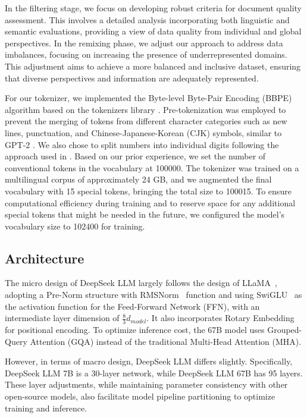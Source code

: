 In the filtering stage, we focus on developing robust criteria for document quality assessment. This involves a detailed analysis incorporating both linguistic and semantic evaluations, providing a view of data quality from individual and global perspectives. In the remixing phase, we adjust our approach to address data imbalances, focusing on increasing the presence of underrepresented domains. This adjustment aims to achieve a more balanced and inclusive dataset, ensuring that diverse perspectives and information are adequately represented.

For our tokenizer, we implemented the Byte-level Byte-Pair Encoding (BBPE) algorithm based on the tokenizers library \citep{hftokenizers}. Pre-tokenization was employed to prevent the merging of tokens from different character categories such as new lines, punctuation, and Chinese-Japanese-Korean (CJK) symbols, similar to GPT-2 \citep{gpt2}. We also chose to split numbers into individual digits following the approach used in \citep{llama, llama2}. Based on our prior experience, we set the number of conventional tokens in the vocabulary at 100000. The tokenizer was trained on a multilingual corpus of approximately 24 GB, and we augmented the final vocabulary with 15 special tokens, bringing the total size to 100015. To ensure computational efficiency during training and to reserve space for any additional special tokens that might be needed in the future, we configured the model's vocabulary size to 102400 for training.

\subsection{Architecture}

The micro design of DeepSeek LLM largely follows the design of LLaMA~\citep{llama, llama2}, adopting a Pre-Norm structure with RMSNorm~\citep{zhang2019root} function and using SwiGLU~\citep{shazeer2020glu} as the activation function for the Feed-Forward Network (FFN), with an intermediate layer dimension of $\frac{8}{3}d_{model}$. It also incorporates Rotary Embedding \citep{su2024roformer} for positional encoding. To optimize inference cost, the 67B model uses Grouped-Query Attention (GQA) \citep{ainslie2023gqa} instead of the traditional Multi-Head Attention (MHA).

However, in terms of macro design, DeepSeek LLM differs slightly. Specifically, DeepSeek LLM 7B is a 30-layer network, while DeepSeek LLM 67B has 95 layers. These layer adjustments, while maintaining parameter consistency with other open-source models, also facilitate model pipeline partitioning to optimize training and inference.

